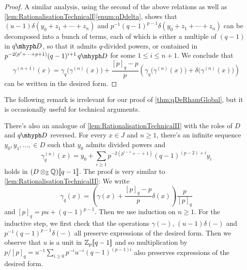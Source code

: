 \documentclass[DIV=12,numbers=enddot,leqno,bibliography=totoc]{scrartcl}
\begin{document}
\begin{proof}
		A similar analysis, using the second of the above relations as well as \cref{lem:RationalisationTechnicalI}\cref{enum:qDdelta}, shows that $(u-1)\delta(y_0+z_1+\dotsb+z_n)$ and $p^{-1}(q-1)^{p-1}\delta(y_0+z_1+\dotsb+z_n)$ can be decomposed into a bunch of terms, each of which is either a multiple of $(q-1)$ in $\q D$, so that it admits $q$-divided powers, or contained in $p^{-2(p^i+\dotsb+p+1)}(q-1)^{i+1}\q D$ for some $1\leqslant i\leqslant n+1$. We conclude that
		\begin{equation*}
			\gamma^{(n+1)}(x)=\gamma_q\bigl(\gamma^{(n)}(x)\bigr)+\frac{[p]_q-p}{p}\left(\gamma_q\bigl(\gamma^{(n)}(x)\bigr)+\delta\bigl(\gamma^{(n)}(x)\bigr)\right)
		\end{equation*}
		can be written in the desired form.
	\end{proof}
	The following remark is irrelevant for our proof of \cref{thm:qDeRhamGlobal}, but it is occasionally useful for technical arguments.
	\begin{rem}\label{rem:qDeRhamRationalisationTechnical}
		There's also an analogue of \cref{lem:RationalisationTechnicalII} with the roles of $D$ and $\q D$ reversed. For every $x\in J$ and $n\geqslant 1$, there's an infinite sequence $y_0,y_1,\dotsc,\in D$ such that $y_0$ admits divided powers and
		\begin{equation*}
			\gamma_q^{(n)}(x)=y_0+\sum_{i\geqslant 1}p^{-2(p^{i-1}+\dotsb+1)}(q-1)^{(p-2)+i}y_i
		\end{equation*}
		holds in $(D\otimes_{\mathbb{Z}}\mathbb{Q})\llbracket q-1\rrbracket$. The proof is very similar to \cref{lem:RationalisationTechnicalII}: We write
		\begin{equation*}
			\gamma_q(x)=\left(\gamma(x)+\frac{[p]_q-p}{p}\delta(x)\right)\frac{p}{[p]_q}
		\end{equation*}
		and $[p]_q=pu+(q-1)^{p-1}$. Then we use induction on $n\geqslant 1$. For the inductive step, we first check that the operations $\gamma(-)$, $(u-1)\delta(-)$ and $p^{-1}(q-1)^{p-1}\delta(-)$ all preserve expressions of the desired form. Then we observe that $u$ is a unit in $\mathbb{Z}_p\llbracket q-1\rrbracket$ and so multiplication by $p/[p]_q=u^{-1}\sum_{i\geqslant 0}p^{-i}u^{-i}(q-1)^{(p-1)i}$ also preserves expressions of the desired form.
	\end{rem}
\end{document}
